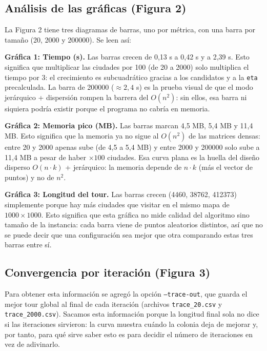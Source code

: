 \documentclass[12pt,a4paper]{article}
\begin{document}
\subsection{Análisis de las gráficas (Figura 2)}

La Figura 2 tiene tres diagramas de barras, uno por métrica, con una barra por
tamaño (20, 2000 y 200000). Se leen así:

\textbf{Gráfica 1: Tiempo (s).} Las barras crecen de 0,13 s a 0,42 s y a 2,39
s. Esto significa que multiplicar las ciudades por 100 (de 20 a 2000) solo
multiplica el tiempo por 3: el crecimiento es subcuadrático gracias a los
candidatos y a la \texttt{eta} precalculada. La barra de 200000 ($\approx 2,4$ s)
es la prueba visual de que el modo jerárquico + dispersión rompen la barrera
del $O(n^2)$: sin ellos, esa barra ni siquiera podría existir porque el programa
no cabría en memoria.

\textbf{Gráfica 2: Memoria pico (MB).} Las barras marcan 4,5 MB, 5,4 MB y 11,4
MB. Esto significa que la memoria ya no sigue al $O(n^2)$ de las matrices
densas: entre 20 y 2000 apenas sube (de 4,5 a 5,4 MB) y entre 2000 y 200000
solo sube a 11,4 MB a pesar de haber $\times 100$ ciudades. Esa curva plana es
la huella del diseño disperso $O(n \cdot k)$ + jerárquico: la memoria depende
de $n \cdot k$ (más el vector de puntos) y no de $n^2$.

\textbf{Gráfica 3: Longitud del tour.} Las barras crecen (4460, 38762,
412373) simplemente porque hay más ciudades que visitar en el mismo mapa de
$1000 \times 1000$. Esto significa que esta gráfica no mide calidad del
algoritmo sino tamaño de la instancia: cada barra viene de puntos aleatorios
distintos, así que no se puede decir que una configuración sea mejor que otra
comparando estas tres barras entre sí.

\subsection{Convergencia por iteración (Figura 3)}

Para obtener esta información se agregó la opción \texttt{--trace-out}, que
guarda el mejor tour global al final de cada iteración (archivos
\texttt{trace\_20.csv} y \texttt{trace\_2000.csv}). Sacamos esta información
porque la longitud final sola no dice si las iteraciones sirvieron: la curva
muestra cuándo la colonia deja de mejorar y, por tanto, para qué sirve saber
esto es para decidir el número de iteraciones en vez de adivinarlo.
\end{document}

